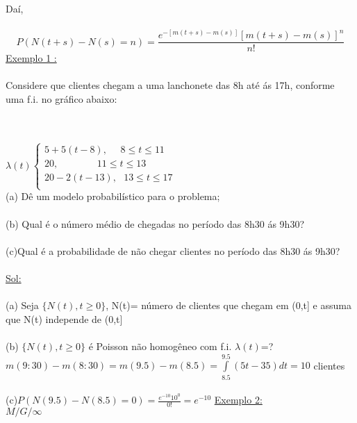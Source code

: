 \documentclass[a4paper,12pt]{article}
\begin{document}
 Daí,\\
 \\
 $$P(N(t+s)-N(s)=n)=\frac{e^{-[m(t+s)-m(s)]}[m(t+s)-m(s)]^n}{n!} $$
 \newpage
 \underline{Exemplo 1 :}\\
 \\
 Considere que clientes chegam a uma lanchonete das 8h até ás 17h, conforme uma f.i. no gráfico abaixo:\\
 \\
 \\
  $\lambda(t) 
 \begin{cases*}
 5+5(t-8), \ \ \ \ \ \  8\le t\le11\\
 20,\ \ \ \ \ \ \  \ \ \ \ \ \ \ \ \ \ \ 11\le t \le 13\\
 20-2(t-13), \ \ \ 13\le t \le 17\\
 \end{cases*} 
 $
 \\
 (a) Dê um modelo probabilístico para o problema;\\
 \\
 (b) Qual é o número médio de chegadas no período das 8h30 ás 9h30?\\
 \\
 (c)Qual é a probabilidade de não chegar clientes no período das 8h30 ás 9h30?\\
 \\
 \newpage
 \underline{Sol:}\\
 \\
 (a) Seja $\{N(t),t\ge0\}$, N(t)= número de clientes que chegam em (0,t] e assuma que N(t) independe de (0,t]\\
 \\
 (b)
  $\{N(t),t\ge0\}$ é Poisson não homogêneo com f.i. $\lambda(t)$=?\\
  $m(9:30)-m(8:30)=m(9.5)-m(8.5)=\int\limits_{8.5}^{9.5}(5t-35)dt=10$ clientes\\
  \\
  (c)$P(N(9.5)-N(8.5)=0)=\frac{e^{-10}10^0}{0!}=e^{-10}$
 \newpage
 \underline{Exemplo 2:}\\
$M / G / \infty$\\
\\
\end{document}
